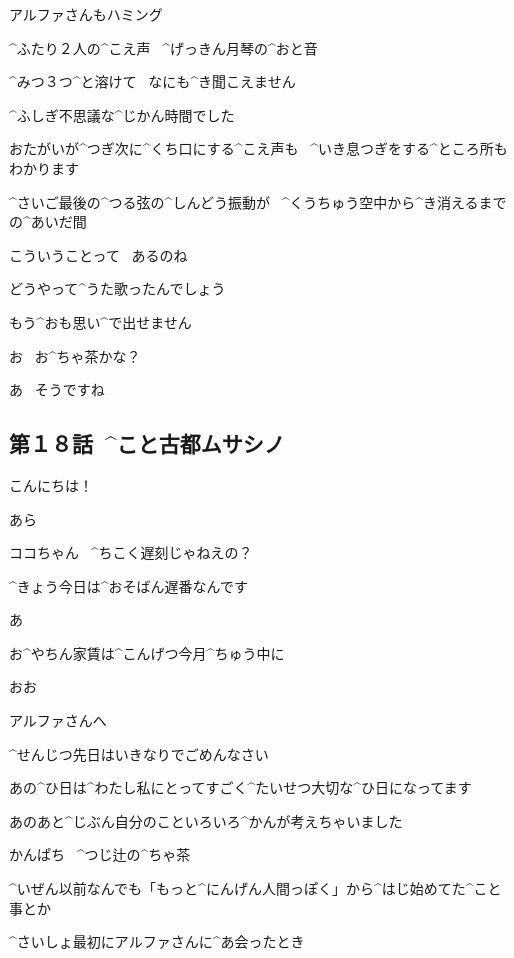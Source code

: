 \Kokone アルファさんもハミング

\Kokone ^{ふたり}{２人}の^{こえ}{声}
\ ^{げっきん}{月琴}の^{おと}{音}

\Kokone ^{みつ}{３つ}^{と}{溶}けて
\ なにも^{き}{聞}こえません

\page[30]
\Kokone ^{ふしぎ}{不思議}な^{じかん}{時間}でした

\Kokone おたがいが^{つぎ}{次}に^{くち}{口}にする^{こえ}{声}も
\ ^{いき}{息}つぎをする^{ところ}{所}もわかります

\page[31]
\Kokone ^{さいご}{最後}の^{つる}{弦}の^{しんどう}{振動}が
\ ^{くうちゅう}{空中}から^{き}{消}えるまでの^{あいだ}{間}

\page[33]
\Alpha こういうことって
\ あるのね

\Kokone どうやって^{うた}{歌}ったんでしょう

\page[34]
\Kokone もう^{おも}{思}い^{で}{出}せません

\Alpha お
\ お^{ちゃ}{茶}かな？

\Kokone あ
\ そうですね


\subsection{第１８話\ ^{こと}{古都}ムサシノ}

\page[37]
\Kokone こんにちは！

\Person あら

\Person ココちゃん
\ ^{ちこく}{遅刻}じゃねえの？

\Kokone ^{きょう}{今日}は^{おそばん}{遅番}なんです

\Kokone あ

\Kokone お^{やちん}{家賃}は^{こんげつ}{今月}^{ちゅう}{中}に

\Person おお

\page[39]
\Kokone アルファさんへ

\Kokone ^{せんじつ}{先日}はいきなりでごめんなさい

\page[41]
\Kokone あの^{ひ}{日}は^{わたし}{私}にとってすごく^{たいせつ}{大切}な^{ひ}{日}になってます

\page[42]
\Kokone あのあと^{じぶん}{自分}のこといろいろ^{かんが}{考}えちゃいました

\Sign かんぱち
\ ^{つじ}{辻}の^{ちゃ}{茶}

\Kokone ^{いぜん}{以前}なんでも「もっと^{にんげん}{人間}っぽく」から^{はじ}{始}めてた^{こと}{事}とか

\page[43]
\Kokone ^{さいしょ}{最初}にアルファさんに^{あ}{会}ったとき

